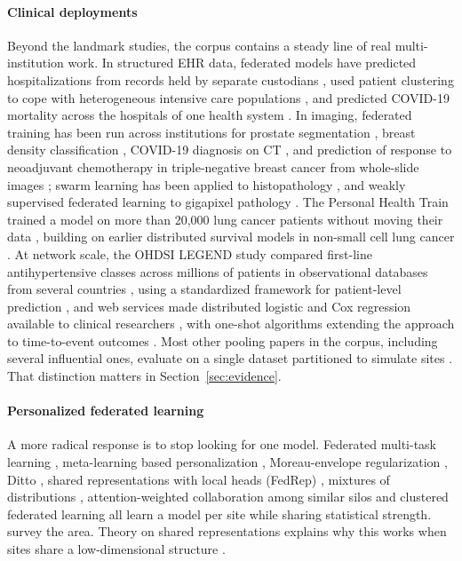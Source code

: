 \documentclass[acmsmall,screen,review]{acmart}
\theoremstyle{acmdefinition}
\begin{document}
\paragraph{Clinical deployments} Beyond the landmark studies, the corpus contains a steady line of real multi-institution work. In structured EHR data, federated models have predicted hospitalizations from records held by separate custodians \cite{brisimi2018federated}, used patient clustering to cope with heterogeneous intensive care populations \cite{huang2019patient}, and predicted COVID-19 mortality across the hospitals of one health system \cite{vaid2021federated}. In imaging, federated training has been run across institutions for prostate segmentation \cite{sarma2021federated}, breast density classification \cite{roth2020federated}, COVID-19 diagnosis on CT \cite{bai2021advancing,dou2021federated}, and prediction of response to neoadjuvant chemotherapy in triple-negative breast cancer from whole-slide images \cite{ogierduterrail2023federated}; swarm learning has been applied to histopathology \cite{saldanha2022swarm}, and weakly supervised federated learning to gigapixel pathology \cite{lu2022federated}. The Personal Health Train trained a model on more than 20,000 lung cancer patients without moving their data \cite{deist2020distributed}, building on earlier distributed survival models in non-small cell lung cancer \cite{jochems2017developing}. At network scale, the OHDSI LEGEND study compared first-line antihypertensive classes across millions of patients in observational databases from several countries \cite{suchard2019comprehensive}, using a standardized framework for patient-level prediction \cite{reps2018design}, and web services made distributed logistic and Cox regression available to clinical researchers \cite{jiang2013webglore,lu2015webdisco}, with one-shot algorithms extending the approach to time-to-event outcomes \cite{duan2020learninglocal}. Most other pooling papers in the corpus, including several influential ones, evaluate on a single dataset partitioned to simulate sites \cite{guo2021multi,li2019privacy,sheller2019multi}. That distinction matters in Section~\ref{sec:evidence}.

\paragraph{Personalized federated learning} A more radical response is to stop looking for one model. Federated multi-task learning \cite{smith2017federated}, meta-learning based personalization \cite{fallah2020personalized}, Moreau-envelope regularization \cite{tdinh2020personalized}, Ditto \cite{li2021ditto}, shared representations with local heads (FedRep) \cite{collins2021exploiting}, mixtures of distributions \cite{marfoq2021federated}, attention-weighted collaboration among similar silos \cite{huang2021personalized} and clustered federated learning \cite{ghosh2020efficient} all learn a model per site while sharing statistical strength. \citet{tan2023personalized} survey the area. Theory on shared representations explains why this works when  sites share a low-dimensional structure \cite{baxter2000model,du2021few,maurer2016benefit,tripuraneni2020theory}.
\end{document}
